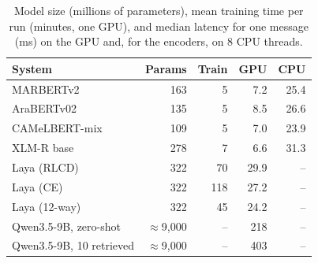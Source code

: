 \begin{table}[t]\centering\small\caption{Model size (millions of parameters), mean training time per run (minutes, one GPU), and median latency for one message (ms) on the GPU and, for the encoders, on 8 CPU threads.}\label{tab:efficiency}
\begin{tabular}{lrrrr}\toprule
System & Params & Train & GPU & CPU \\\midrule
MARBERTv2 & 163 & 5 & 7.2 & 25.4 \\
AraBERTv02 & 135 & 5 & 8.5 & 26.6 \\
CAMeLBERT-mix & 109 & 5 & 7.0 & 23.9 \\
XLM-R base & 278 & 7 & 6.6 & 31.3 \\
Laya (RLCD) & 322 & 70 & 29.9 & -- \\
Laya (CE) & 322 & 118 & 27.2 & -- \\
Laya (12-way) & 322 & 45 & 24.2 & -- \\
Qwen3.5-9B, zero-shot & $\approx$9{,}000 & -- & 218 & -- \\
Qwen3.5-9B, 10 retrieved & $\approx$9{,}000 & -- & 403 & -- \\
\bottomrule\end{tabular}\end{table}
